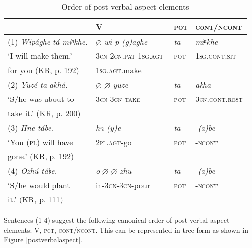 \documentclass[output=paper]{LSP/langsci}
\begin{document}
\begin{table}
\caption{Order of post-verbal aspect elements} \label{order}
\begin{tabular}[h!]{ l l l l }
\lsptoprule
& V& \textsc{pot} & \textsc{cont/ncont} \\
\midrule 
(1)	\textit{Wip\'aghe t\'a miⁿkhe.} & $\varnothing$-\textit{wi-p-(g)aghe}  & \textit{ta} & \textit{miⁿkhe} \\
\hspace{2em} `I will make them.'  & \textsc{3cn-2cn.pat-1sg.agt-}  & \textsc{pot} & \textsc{1sg.cont.sit} \\
\hspace{2em}for you (KR, p. 192) & \hspace{2em}\textsc{1sg.agt}.make & & \\

(2)	\textit{Yuz\'e ta akh\'a.}	 & $\varnothing$-$\varnothing$-\textit{yuze}  & \textit{ta} & \textit{akha} \\
\hspace{2em}`S/he was about to & \textsc{3cn-3cn-take} & \textsc{pot}	& \textsc{3cn.cont.rest} \\
\hspace{2em} take it.' (KR, p. 200)  & & & \\

(3)	\textit{Hne t\'abe.}	& \textit{hn-(y)e} 	& \textit{ta}	& -\textit{(a)be} \\
\hspace{2em}`You (\textsc{pl}) will have  & \textsc{2pl.agt}-go & \textsc{pot} & \textsc{-ncont} \\
\hspace{2em} gone.' (KR, p. 192) & & & \\

(4) \textit{Ozh\'u t\'abe.}	& \textit{o}-$\varnothing$-$\varnothing$-\textit{zhu} 	& \textit{ta}	& -\textit{(a)be} \\
\hspace{2em}`S/he would plant   &	in-\textsc{3cn-3cn}-pour &	\textsc{pot} & \textsc{-ncont} \\
\hspace{2em} it.' (KR, p. 111) & & & \\
\hline \hline
\end{tabular}
\end{table}

Sentences (1-4) suggest the following canonical order of post-verbal aspect elements: V, \textsc{pot}, \textsc{cont/ncont}. This can be represented in tree form as shown in Figure \ref{postverbalaspect}.
\end{document}
